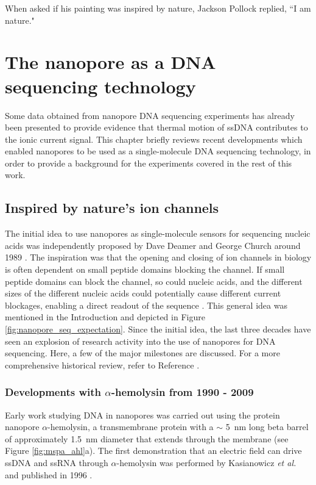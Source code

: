 \begin{savequote}[75mm]
When asked if his painting was inspired by nature, Jackson Pollock replied, ``I am nature."
\end{savequote}

\chapter{The nanopore as a DNA sequencing technology}
\label{dna_sequencing}

Some data obtained from nanopore DNA sequencing experiments has already been presented to provide evidence that thermal motion of ssDNA contributes to the ionic current signal.  This chapter briefly reviews recent developments which enabled nanopores to be used as a single-molecule DNA sequencing technology, in order to provide a background for the experiments covered in the rest of this work.

\section{Inspired by nature's ion channels}

The initial idea to use nanopores as single-molecule sensors for sequencing nucleic acids was independently proposed by Dave Deamer and George Church around 1989 \citep{Deamer2016,Branton2008}.  The inspiration was that the opening and closing of ion channels in biology is often dependent on small peptide domains blocking the channel.  If small peptide domains can block the channel, so could nucleic acids, and the different sizes of the different nucleic acids could potentially cause different current blockages, enabling a direct readout of the sequence \citep{Branton2008}.  This general idea was mentioned in the Introduction and depicted in Figure \ref{fig:nanopore_seq_expectation}.  Since the initial idea, the last three decades have seen an explosion of research activity into the use of nanopores for DNA sequencing.  Here, a few of the major milestones are discussed.  For a more comprehensive historical review, refer to Reference .

\subsection{Developments with $\alpha$-hemolysin from 1990 - 2009}

Early work studying DNA in nanopores was carried out using the protein nanopore $\alpha$-hemolysin, a transmembrane protein with a $\sim$ \SI{5}{\nm} long beta barrel of approximately \SI{1.5}{\nm} diameter that extends through the membrane (see Figure \ref{fig:mspa_ahl}a).  The first demonstration that an electric field can drive ssDNA and ssRNA through $\alpha$-hemolysin was performed by Kasianowicz \textit{et al.} and published in 1996 \citep{Kasianowicz1996}.


